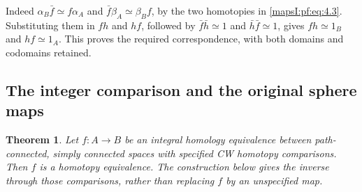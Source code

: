 \documentclass[11pt]{article}
\newtheorem{theorem}{Theorem}[section]
\begin{document}
Indeed \(\alpha_B\bar f\simeq f\alpha_A\) and \(\bar f\beta_A\simeq\beta_Bf\), by the two homotopies in \eqref{mapsI:pf:eq:4.3}. Substituting them in \(fh\) and \(hf\), followed by \(\bar f\bar h\simeq1\) and \(\bar h\bar f\simeq1\), gives \(fh\simeq1_B\) and \(hf\simeq1_A\). This proves the required correspondence, with both domains and codomains retained.

\subsection{The integer comparison and the original sphere maps}
\label{mapsI:pf:integral-comparison}

\begin{theorem}
\label{mapsI:pf:theorem:5.1}
Let \(f:A\to B\) be an integral homology equivalence between path-connected, simply connected spaces with specified CW homotopy comparisons. Then \(f\) is a homotopy equivalence. The construction below gives the inverse through those comparisons, rather than replacing \(f\) by an unspecified map.
\end{theorem}
\end{document}
